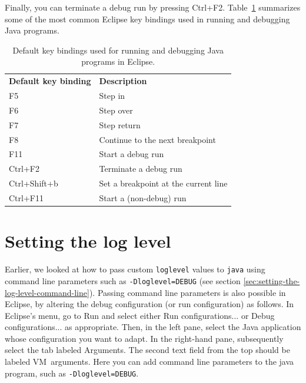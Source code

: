 \documentclass[12pt, a4paper, twoside, openany, titlepage]{book}
\begin{document}
Finally, you can terminate a debug run by pressing \textsf{Ctrl+F2}. Table~\ref{tab:key-bindings-eclipse} summarizes some of the most common Eclipse key bindings used in running and debugging Java programs.


\begin{table}[!ht]
\vspace{1.0em}
\caption{Default key bindings used for running and debugging Java programs in Eclipse.\label{tab:key-bindings-eclipse}}
\begin{tabular}{lp{10cm}}
\vspace{0.5em}
\textbf{Default key binding} & \textbf{Description}                  \\
\textsf{F5}                  & Step in                               \\
\textsf{F6}                  & Step over                             \\
\textsf{F7}                  & Step return                           \\
\textsf{F8}                  & Continue to the next breakpoint       \\
\textsf{F11}                 & Start a debug run                     \\
\textsf{Ctrl+F2}             & Terminate a debug run                 \\
\textsf{Ctrl+Shift+b}        & Set a breakpoint at the current line  \\
\textsf{Ctrl+F11}            & Start a (non-debug) run               \\
\end{tabular}
\end{table}

\section{Setting the log level}

Earlier, we looked at how to pass custom \texttt{loglevel} values to \texttt{java} using command line parameters such as \texttt{-Dloglevel=DEBUG} (see section \ref{sec:setting-the-log-level-command-line}). Passing command line parameters is also possible in Eclipse, by altering the debug configuration (or run configuration) as follows. In Eclipse's menu, go to \textsf{Run} and select either \textsf{Run configurations...} or \textsf{Debug configurations...} as appropriate. Then, in the left pane, select the Java application whose configuration you want to adapt. In the right-hand pane, subsequently select the tab labeled \textsf{Arguments}. The second text field from the top should be labeled \textsf{VM~arguments}. Here you can add command line parameters to the java program, such as \texttt{-Dloglevel=DEBUG}.
\end{document}
